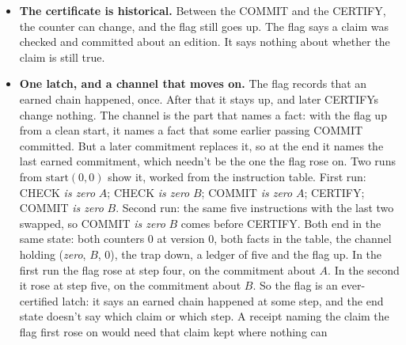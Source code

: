 \documentclass[11pt,twoside]{article}
\theoremstyle{thielethm}
\theoremstyle{thieledef}
\theoremstyle{thieledef}
\theoremstyle{thieledef}
\theoremstyle{thielethm}
\theoremstyle{thieleobs}
\theoremstyle{thielethm}
\begin{document}
\begin{itemize}
refuses an unsorted one forever. The instruction rules are those already given, with the chosen property language in place
of the three original properties. For sorted lists, decode 0 as the empty list and
$2^h(2t+1)$ as the list with head $h$ and tail decoded from $t$, the list code of
Theorem~\ref{thm:u34-tc-instances}.
Every positive code has $t$ smaller than itself, so decoding terminates. The checker
returns yes on an empty list or singleton, and on $a,b,\ldots$ exactly when $a\le b$
and it returns yes on $b,\ldots$. Induction on the list proves that this is exactly
adjacent nondecreasing order. The provenance proof uses only equality of properties, and soundness only that the checker's yes means the property holds, so the same instruction-by-instruction argument applies. What makes that a check of
the list is the proof that the checker means sortedness. Without that proof, ``sorted'' would be a number
some unconstrained code wrote into a counter, and the record would be honest about the counter
and silent about the list.
\item \textbf{The certificate is historical.} Between the COMMIT and the CERTIFY, the counter can
change, and the flag still goes up. The flag says a claim was checked and committed about
an edition. It says nothing about whether the claim is still true.
\item \textbf{One latch, and a channel that moves on.} The flag records that an earned chain
happened, once. After that it stays up, and later CERTIFYs change nothing. The channel is the
part that names a fact: with the flag up from a clean start, it names a fact that some earlier
passing COMMIT committed. But a later commitment replaces it, so at the end
it names the last earned commitment, which needn't be the one the flag rose on. Two runs from
$\mathrm{start}(0, 0)$ show it, worked from the instruction table. First run: CHECK \emph{is zero}
$A$; CHECK \emph{is zero} $B$; COMMIT \emph{is zero} $A$; CERTIFY; COMMIT \emph{is zero} $B$.
Second run: the same five instructions with the last two swapped, so COMMIT \emph{is zero} $B$
comes before CERTIFY. Both end in the same state: both counters 0 at version 0, both facts in the
table, the channel holding (\emph{zero}, $B$, 0), the trap down, a ledger of five and the flag
up. In the first run the flag rose at step four, on the commitment about $A$. In the second it
rose at step five, on the commitment about $B$. So the flag is an ever-certified latch: it says
an earned chain happened at some step, and the end state doesn't say which claim or which step.
A receipt naming the claim the flag first rose on would need that claim kept where nothing can

\end{itemize}
\end{document}
